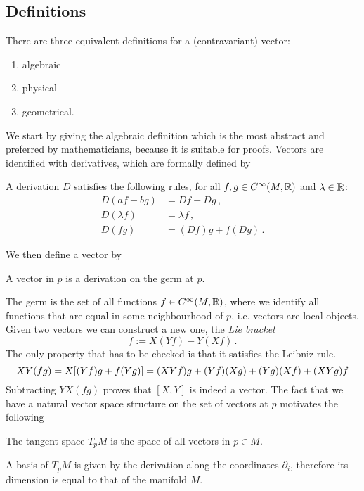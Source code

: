 \subsection{Definitions}
There are three equivalent definitions for a
(contravariant) vector:
\begin{enumerate}
    \item algebraic 
    \item physical
    \item geometrical.
\end{enumerate}
We start by giving the algebraic definition which is the most
abstract and preferred by mathematicians, because it is suitable for proofs.
Vectors are identified with derivatives, which are formally defined by
\begin{definition}[Derivation]
A derivation $D$ satisfies the following rules, for all $f,g\in
C^\infty(M,\mathbb{R})$ and $\lambda \in \mathbb{R}$:
\begin{align}
    D(af+bg) &=Df+Dg\,,\\
    D(\lambda f)&=\lambda f\,,\\
    D(fg)&= (Df)g+f(Dg)\,.
\end{align}
\end{definition}
We then define a vector by 
\begin{definition} A vector in $p$ is a derivation on the germ at $p$.
\end{definition}
The germ is the set of all functions $f\in C^\infty(M,\mathbb{R})$, where we
identify all functions that are equal in some neighbourhood of $p$, i.e. vectors are local objects.
Given two vectors we can construct a new one, the \emph{Lie bracket}
\begin{equation}
    [X,Y]f:=X(Yf)-Y(Xf)\, .\label{eq:LieBraket}
\end{equation}
The only property that has to be checked is that it satisfies the Leibniz rule.
\begin{equation}
    XY(fg)=X[(Yf)g+f(Yg)]=(XYf)g+(Yf)(Xg)+(Yg)(Xf)+(XYg)f\\
\end{equation}
Subtracting $YX(fg)$ proves that $[X,Y]$ is indeed a vector. The fact that we
have a natural vector space structure on the set of vectors at $p$ motivates the
following
\begin{definition}
The tangent space $T_pM$ is the space of all vectors in $p\in M$.
\end{definition}
A basis of $T_pM$ is given by the derivation along the
coordinates $\partial_i$, therefore its dimension is equal to that of the manifold $M$.
